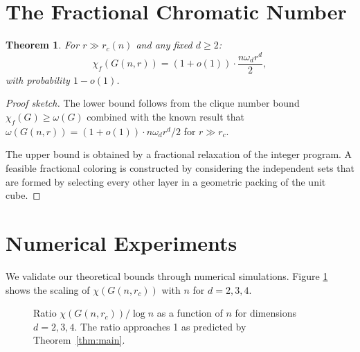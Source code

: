 \documentclass[11pt]{article}
\newtheorem{theorem}{Theorem}[section]
\theoremstyle{definition}
\begin{document}
\section{The Fractional Chromatic Number}

\begin{theorem}\label{thm:fractional}
For $r \gg r_c(n)$ and any fixed $d \geq 2$:
\begin{equation}\label{eq:fractional}
  \chi_f(G(n, r)) = (1 + o(1)) \cdot \frac{n \omega_d r^d}{2},
\end{equation}
with probability $1 - o(1)$.
\end{theorem}

\begin{proof}[Proof sketch]
The lower bound follows from the clique number bound
$\chi_f(G) \geq \omega(G)$ combined with the known result that
$\omega(G(n,r)) = (1 + o(1)) \cdot n \omega_d r^d / 2$ for $r \gg r_c$.

The upper bound is obtained by a fractional relaxation of the integer
program. A feasible fractional coloring is constructed by considering the
independent sets that are formed by selecting every other layer in a
geometric packing of the unit cube.
\end{proof}


\section{Numerical Experiments}

We validate our theoretical bounds through numerical simulations. Figure
\ref{fig:chromatic-scaling} shows the scaling of $\chi(G(n, r_c))$ with
$n$ for $d = 2, 3, 4$.

\begin{figure}[htbp]
\centering
{}
\caption{Ratio $\chi(G(n, r_c)) / \log n$ as a function of $n$ for
  dimensions $d = 2, 3, 4$. The ratio approaches 1 as predicted by
  Theorem~\ref{thm:main}.}\label{fig:chromatic-scaling}
\end{figure}
\end{document}
